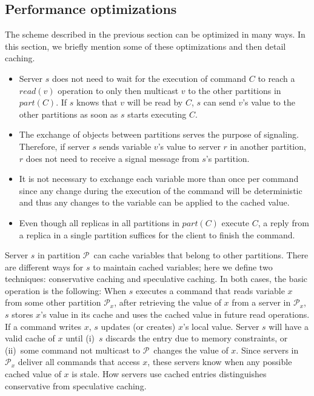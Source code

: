 \documentclass[11pt]{article}
\newcommand{\pp}{$\mathcal{P}$}
\newcommand{\ppm}{\mathcal{P}}
\begin{document}
\subsection{Performance optimizations}
\label{sec:optm}

The scheme described in the previous section can be optimized in many ways.
In this section, we briefly mention some of these optimizations and then detail caching.
\begin{itemize}
\item Server $s$ does not need to wait for the execution of command $C$ to reach a $read(v)$ operation to only then multicast $v$ to the other partitions in $part(C)$. If $s$ knows that $v$ will be read by $C$, $s$ can send $v$'s value to the other partitions as soon as $s$ starts executing $C$.
\item The exchange of objects between partitions serves the purpose of signaling. Therefore, if server $s$ sends variable $v$'s value to server $r$ in another partition, $r$ does not need to receive a signal message from $s$'s partition.
\item It is not necessary to exchange each variable more than once per command since any change during the execution of the command will be deterministic and thus any changes to the variable can be applied to the cached value.
\item Even though all replicas in all partitions in $part(C)$ execute $C$, a reply from a replica in a single partition suffices for the client to finish the command.
\end{itemize}

Server $s$ in partition \pp\ can cache variables that belong to other partitions.
There are different ways for $s$ to maintain cached variables; here we define two techniques: conservative caching and speculative caching.
In both cases, the basic operation is the following:
When $s$ executes a command that reads variable $x$ from some other partition $\ppm{}_x$, after retrieving the value of $x$ from a server in $\ppm{}_x$, $s$ stores $x$'s value in its cache and uses the cached value in future read operations.
If a command writes $x$, $s$ updates (or creates) $x$'s local value.
Server $s$ will have a valid cache of $x$ until (i)~$s$ discards the entry due to memory constraints, or (ii)~some command not multicast to \pp\ changes the value of $x$.
Since servers in $\ppm_x$ deliver all commands that access $x$, these servers know when any possible cached value of $x$ is stale.
How servers use cached entries distinguishes conservative from speculative caching.
\end{document}
